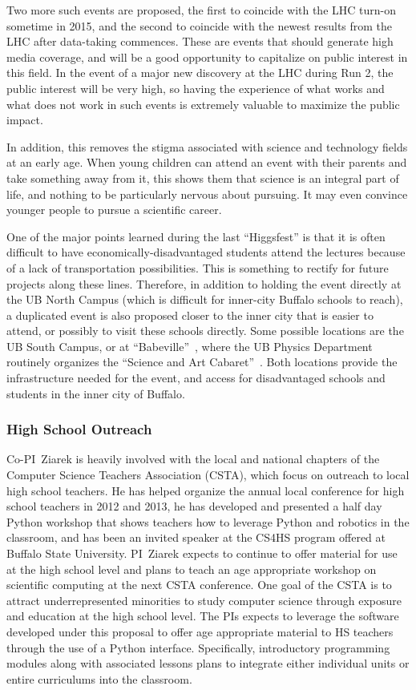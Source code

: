 \documentclass[times,11pt]{article}
\begin{document}
Two more such events are proposed, the first to coincide with the LHC
turn-on sometime in 2015, and the second to coincide with the newest
results from the LHC after data-taking commences. These are 
events that should generate high media coverage, and will be a good
opportunity to capitalize on public interest in this field.
In the event of a major new discovery at the LHC
during Run 2, the public interest will be very high, so having the
experience of what works and what does not work in such events is
extremely valuable to maximize the public impact. 

In addition, this removes the stigma associated with science and
technology fields at an early age. When young children can attend an
event with their parents and take something away from it, this shows
them that science is an integral part of life, and nothing to be
particularly nervous about pursuing. It may even convince younger
people to pursue a scientific career. 

One of the major points learned during the last ``Higgsfest''
is that it is often difficult to have economically-disadvantaged
students attend the lectures because of a lack of transportation
possibilities. This is something to rectify for future
projects along these lines. Therefore, in addition to holding the
event directly
at the UB North Campus (which is difficult for inner-city
Buffalo schools to reach), a duplicated event is also proposed
closer to the inner city that is easier to attend, or possibly to
visit these schools directly. Some possible
locations are the UB South Campus, or at
``Babeville''~\cite{babeville}, where the UB Physics
Department routinely organizes the ``Science and Art
Cabaret''~\cite{cabaret}. Both locations 
provide the infrastructure needed for the event, and
access for disadvantaged schools and students in the inner city of
Buffalo. 

\subsubsection{High School Outreach}
Co-PI~Ziarek is heavily involved with the local and national chapters of the Computer Science Teachers Association (CSTA), which
focus on outreach to local high school teachers. He has helped organize the annual local conference for high school teachers in
2012 and 2013, he has developed and presented a half day Python workshop that shows teachers how to leverage Python and
robotics in the classroom, and has been an invited speaker at the CS4HS program offered at Buffalo State University.
PI~Ziarek expects to continue to offer
material for use at the high school level and plans to teach an age appropriate  workshop on scientific computing at the next
CSTA conference. One goal of the CSTA is to attract underrepresented minorities to study computer science through
exposure and education at the high school level.  
The PIs expects to leverage the software developed under this proposal to offer age appropriate material to HS teachers 
through the use of a Python interface. Specifically,
introductory programming modules along with associated lessons plans to integrate either individual units or entire
curriculums into the classroom.
\end{document}
